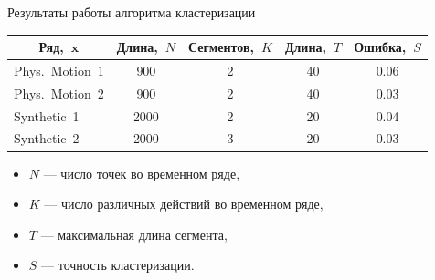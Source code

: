 \documentclass[10pt,pdf,hyperref={unicode}]{beamer}
\begin{document}
\begin{frame}{Результаты работы алгоритма кластеризации}

\begin{tabular}{|c|c|c|c|c|}
\hline
	Ряд,~$\textbf{x}$ &Длина,~$N$& Сегментов,~$K$&Длина,~$T$& Ошибка,~$S$\\
	\hline
	\multicolumn{1}{|l|}{Phys.~Motion~1}
	& 900& 2& 40& 0.06\\
	\hline
	\multicolumn{1}{|l|}{Phys.~Motion~2}
	& 900& 2& 40& 0.03\\
	\hline
	\multicolumn{1}{|l|}{Synthetic~1}
	& 2000& 2& 20& 0.04\\
	\hline
	\multicolumn{1}{|l|}{Synthetic~2}
	& 2000& 3& 20& 0.03\\
\hline
\end{tabular}

\begin{itemize}
	\item $N$ --- число точек во временном ряде,
	\item $K$ --- число различных действий во временном ряде,
	\item $T$ --- максимальная длина сегмента,
	\item $S$ --- точность кластеризации.
\end{itemize}

\end{frame}
\end{document}
